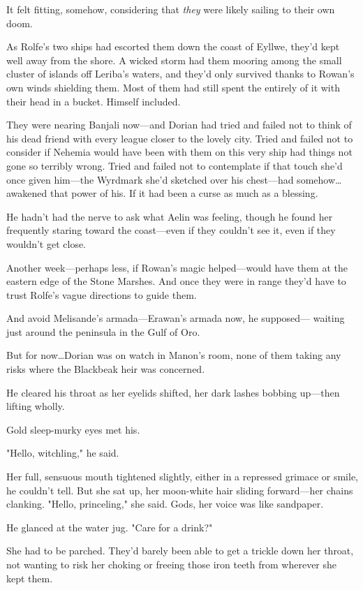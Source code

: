 It felt fitting, somehow, considering that \emph{they} were likely sailing to their own doom.

As Rolfe's two ships had escorted them down the coast of Eyllwe, they'd kept well away from the shore.
A wicked storm had them mooring among the small cluster of islands off Leriba's waters, and they'd only survived thanks to Rowan's own winds shielding them.
Most of them had still spent the entirely of it with their head in a bucket.
Himself included.

They were nearing Banjali now---and Dorian had tried and failed not to think of his dead friend with every league closer to the lovely city.
Tried and failed not to consider if Nehemia would have been with them on this very ship had things not gone so terribly wrong.
Tried and failed not to contemplate if that touch she'd once given him---the Wyrdmark she'd sketched over his chest---had somehow\ldots awakened that power of his.
If it had been a curse as much as a blessing.

He hadn't had the nerve to ask what Aelin was feeling, though he found her frequently staring toward the coast---even if they couldn't see it, even if they wouldn't get close.

Another week---perhaps less, if Rowan's magic helped---would have them at the eastern edge of the Stone Marshes.
And once they were in range  they'd have to trust Rolfe's vague directions to guide them.

And avoid Melisande's armada---Erawan's armada now, he supposed--- waiting just around the peninsula in the Gulf of Oro.

But for now\ldots Dorian was on watch in Manon's room, none of them taking any risks where the Blackbeak heir was concerned.

He cleared his throat as her eyelids shifted, her dark lashes bobbing up---then lifting wholly.

Gold sleep-murky eyes met his.

"Hello, witchling," he said.

Her full, sensuous mouth tightened slightly, either in a repressed grimace or smile, he couldn't tell.
But she sat up, her moon-white hair sliding forward---her chains clanking.
"Hello, princeling," she said.
Gods, her voice was like sandpaper.

He glanced at the water jug.
"Care for a drink?"

She had to be parched.
They'd barely been able to get a trickle down her throat, not wanting to risk her choking or freeing those iron teeth from wherever she kept them.

